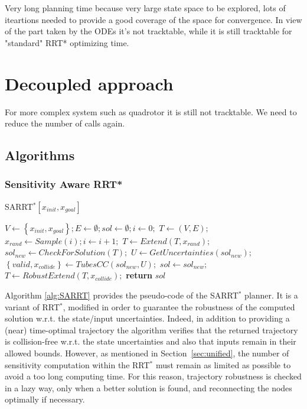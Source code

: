 Very long planning time because very large state space to be explored, lots of iteartions needed to provide a good coverage of the space for convergence.
In view of the part taken by the ODEs it's not tracktable, while it is still tracktable for "standard" RRT* optimizing time.

\section{Decoupled approach}\label{sec:decoupled}
For more complex system such as quadrotor it is still not tracktable. We need to reduce the number of calls again.
\subsection{Algorithms}
\subsubsection{Sensitivity Aware RRT*}

\begin{algorithm}[htp]
    \caption{SARRT$^* [x_{init}, x_{goal}]$}\label{alg:SARRT}
    \begin{algorithmic}[1]
        \State $V \gets \left \{ x_{init}, x_{goal} \right \}; E \gets \emptyset; sol \gets \emptyset; i \gets 0;$
            \State $T \gets (V,E);$
            \State $x_{rand} \gets Sample(i); i \gets i+1;$
            \State $T \gets Extend(T, x_{rand});$
            \State $sol_{new} \gets CheckForSolution(T);$
                \State $U \gets GetUncertainties(sol_{new});$
                \State $\left \{ valid, x_{collide} \right \} \gets TubesCC(sol_{new}, U);$
                    \State $sol\gets sol_{new};$
                \Else
                    \State $T \gets RobustExtend(T,x_{collide});$
                \EndIf
            \EndIf
        \EndWhile
        \State \textbf{return} $sol$
    \end{algorithmic}
\end{algorithm}

Algorithm \ref{alg:SARRT} provides the pseudo-code of the SARRT$^*$ planner.  
It is a variant of RRT$^*$, modified in order to guarantee the robustness of the computed solution w.r.t. the state/input uncertainties.
Indeed, in addition to providing a (near) time-optimal trajectory the algorithm verifies that the returned trajectory is collision-free w.r.t. the state uncertainties and also that inputs remain in their allowed bounds.
However, as mentioned in Section~\ref{sec:unified}, the number of sensitivity computation within the RRT$^*$ must remain as limited as possible to avoid a too long computing time. 
For this reason, trajectory robustness is checked in a lazy way, only when a better solution is found, and reconnecting the nodes optimally if necessary.

